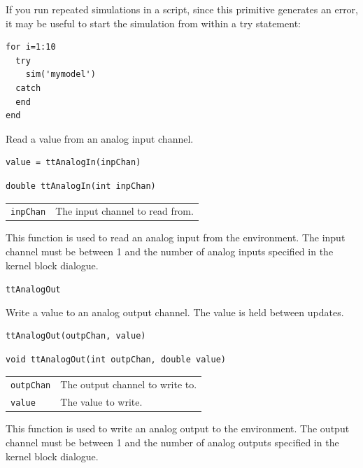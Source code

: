 \documentclass[final,twoside]{rapport}
\begin{document}
If you run repeated simulations in a script, since this primitive
generates an error, it may be useful to start the simulation from
within a try statement:
\begin{verbatim}
for i=1:10
  try
    sim('mymodel')
  catch
  end
end
\end{verbatim}



\purpose
Read a value from an analog input channel.

\Msyntax
\begin{verbatim}
value = ttAnalogIn(inpChan)
\end{verbatim}

\Csyntax
\begin{verbatim}
double ttAnalogIn(int inpChan)
\end{verbatim}

\args
\begin{tabularx}{\hsize}{l>{\raggedright\arraybackslash}X}
  {\tt inpChan} & The input channel to read from. 
\end{tabularx}

\descr This function is used to read an analog input from the
environment. The input channel must be between 1 and the number of
analog inputs specified in the kernel block dialogue.

\seealso
{\tt ttAnalogOut}



\purpose
Write a value to an analog output channel. The value is held
between updates.

\Msyntax
\begin{verbatim}
ttAnalogOut(outpChan, value)
\end{verbatim}

\Csyntax
\begin{verbatim}
void ttAnalogOut(int outpChan, double value)
\end{verbatim}

\args
\begin{tabularx}{\hsize}{l>{\raggedright\arraybackslash}X}
  {\tt outpChan} & The output channel to write to. \\
  {\tt value} & The value to write.
\end{tabularx}

\descr This function is used to write an analog output to the
environment. The output channel must be between 1 and the number of
analog outputs specified in the kernel block dialogue.
\end{document}
